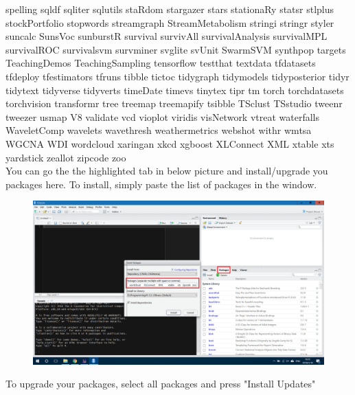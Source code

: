 \documentclass[10pt]{article} %
\begin{document}
\begin{itemize}
      spelling
      sqldf
      sqliter
      sqlutils
      staRdom
      stargazer
      stars
      stationaRy
      statsr
      stlplus
      stockPortfolio
      stopwords
      streamgraph
      StreamMetabolism
      stringi
      stringr
      styler
      suncalc
      SunsVoc
      sunburstR
      survival
      survivAll
      survivalAnalysis
      survivalMPL
      survivalROC
      survivalsvm
      survminer
      svglite
      svUnit
      SwarmSVM
      synthpop
      targets
      TeachingDemos
      TeachingSampling
      tensorflow
      testthat
      textdata
      tfdatasets
      tfdeploy
      tfestimators
      tfruns
      tibble
      tictoc
      tidygraph
      tidymodels
      tidyposterior
      tidyr
      tidytext
      tidyverse
      tidyverts
      timeDate
      timevs
      tinytex
      tipr
      tm
      torch
      torchdatasets
      torchvision
      transformr
      tree
      treemap
      treemapify
      tsibble
      TSclust
      TSstudio
      tweenr
      tweezer
      usmap
      V8
      validate
      vcd
      vioplot
      viridis
      visNetwork
      vtreat
      waterfalls
      WaveletComp
      wavelets
      wavethresh
      weathermetrics
      webshot
      withr
      wmtsa
      WGCNA
      WDI
      wordcloud
      xaringan
      xkcd
      xgboost
      XLConnect
      XML
      xtable
      xts
      yardstick
      zeallot
      zipcode
      zoo
      \\

      You can go the the highlighted tab in below picture and install/upgrade you packages here.
      To install, simply paste the list of packages in the window.

      \begin{figure}[h!]
        \centering
        \includegraphics[width=0.7\linewidth]{figs/installPackages}
        \caption{}
        \label{fig:installpackages}
      \end{figure}

      To upgrade your packages, select all packages and press "Install Updates"


\end{itemize}
\end{document}
